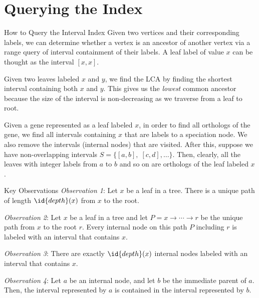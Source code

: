 \documentclass{beamer}
\begin{document}
\section{Querying the Index}

\begin{frame}{How to Query the Interval Index}
    Given two vertices and their corresponding labels, we can determine whether a vertex is an ancestor of another vertex via a range query of interval containment of their labels. A leaf label of value $x$ can be thought as the interval $[x,x]$.

    Given two leaves labeled $x$ and $y$, we find the LCA by finding the shortest interval containing both $x$ and $y$. This gives us the \textit{lowest} common ancestor because the size of the interval is non-decreasing as we traverse from a leaf to root.

    Given a gene represented as a leaf labeled $x$, in order to find all orthologs of the gene, we find all intervals containing $x$ that are labels to a speciation node. We also remove the intervals (internal nodes) that are visited. After this, suppose we have non-overlapping intervals $S = \{[a,b],\; [c,d],\ldots\}$. Then, clearly, all the leaves with integer labels from $a$ to $b$ and so on are orthologs of the leaf labeled $x$.
\end{frame}

\begin{frame}{Key Observations}
    \textit{Observation 1}: Let $x$ be a leaf in a tree. There is a unique path of length $\id{depth}(x)$ from $x$ to the root.

    \textit{Observation 2}: Let $x$ be a leaf in a tree and let $P = x \to \cdots \to r$ be the unique path from $x$ to the root $r$. Every internal node on this path $P$ including $r$ is labeled with an interval that contains $x$.

    \textit{Observation 3}: There are exactly $\id{depth}(x)$ internal nodes labeled with an interval that contains $x$.

    \textit{Observation 4}: Let $a$ be an internal node, and let $b$ be the immediate parent of $a$. Then, the interval represented by $a$ is contained in the interval represented by $b$.
\end{frame}
\end{document}

